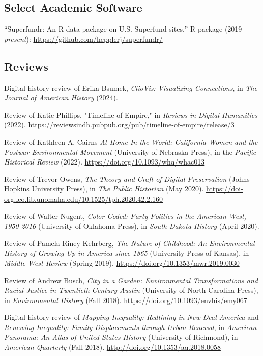\documentclass[10pt]{article}
\begin{document}
\subsection{Select Academic Software}

``Superfundr: An R data package on U.S. Superfund sites,'' R package (2019--\textit{present}): \url{https://github.com/hepplerj/superfundr/}

\subsection{Reviews}

Digital history review of Erika Bsumek, \textit{ClioVis: Visualizing Connections}, in \textit{The Journal of American History} (2024).

Review of Katie Phillips, "Timeline of Empire," in \textit{Reviews in Digital Humanities} (2022). \url{https://reviewsindh.pubpub.org/pub/timeline-of-empire/release/3}

Review of Kathleen A. Cairns \textit{At Home In the World: California Women and the Postwar Environmental Movement} (University of Nebraska Press), in the \textit{Pacific Historical Review} (2022). \url{https://doi.org/10.1093/whq/whac013}

Review of Trevor Owens, \textit{The Theory and Craft of Digital Preservation} (Johns Hopkins University Press), in \textit{The Public Historian} (May 2020). \url{https://doi-org.leo.lib.unomaha.edu/10.1525/tph.2020.42.2.160}

Review of Walter Nugent, \textit{Color Coded: Party Politics in the American West, 1950-2016} (University of Oklahoma Press), in \textit{South Dakota History} (April 2020).

Review of Pamela Riney-Kehrberg, \textit{The Nature of Childhood: An Environmental History of Growing Up in America since 1865} (University Press of Kansas), in \textit{Middle West Review} (Spring 2019). \url{https://doi.org/10.1353/mwr.2019.0030}

Review of Andrew Busch, \textit{City in a Garden: Environmental Transformations and Racial Justice in Twentieth-Century Austin} (University of North Carolina Press), in \textit{Environmental History} (Fall 2018). \url{https://doi.org/10.1093/envhis/emy067}

Digital history review of \textit{Mapping Inequality: Redlining in New Deal America} and \textit{Renewing Inequality: Family Displacements through Urban Renewal}, in \textit{American Panorama: An Atlas of United States History} (University of Richmond), in \textit{American Quarterly} (Fall 2018). \url{http://doi.org/10.1353/aq.2018.0058}
\end{document}
